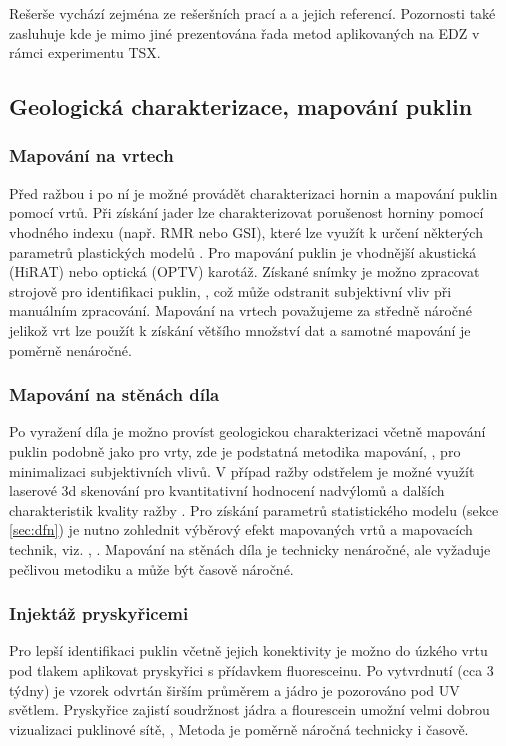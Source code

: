 \documentclass{article}
\begin{document}
Rešerše vychází zejména ze rešeršních prací \cite{Vavro2016} a \cite{Lanyon2011} a jejich referencí. 
Pozornosti také zasluhuje \cite{Chandler2002} kde je mimo jiné prezentována řada metod aplikovaných na EDZ v rámci experimentu TSX.



\subsection{Geologická charakterizace, mapování puklin}
\label{sec:mapovani_puklin}
\subsubsection{Mapování na vrtech}
Před ražbou i po ní je možné provádět charakterizaci hornin a mapování puklin pomocí vrtů. 
Při získání jader lze charakterizovat porušenost horniny pomocí vhodného indexu (např. RMR nebo GSI), 
které lze využít k určení některých parametrů plastických modelů \cite{Hoek2002}. 
Pro mapování puklin je vhodnější akustická (HiRAT) nebo optická (OPTV) karotáž. Získané snímky je možno 
zpracovat strojově pro identifikaci puklin, \cite{Tammisto2002}, což může odstranit subjektivní vliv při manuálním zpracování.
Mapování na vrtech považujeme za středně náročné jelikož vrt lze použít k získání většího množství dat 
a samotné mapování je poměrně nenáročné.

\subsubsection{Mapování na stěnách díla}
Po vyražení díla je možno províst geologickou charakterizaci včetně mapování puklin podobně jako pro vrty, 
zde je podstatná metodika mapování, \cite{Bossart2002},  pro minimalizaci subjektivních vlivů. 
V případ ražby odstřelem je možné využít laserové 3d skenování pro kvantitativní hodnocení 
nadvýlomů a dalších charakteristik kvality ražby \cite{Hudson2009a}. 
Pro získání parametrů statistického modelu (sekce \ref{sec:dfn}) je nutno zohlednit výběrový efekt 
mapovaných vrtů a mapovacích technik, viz. \cite{Zetterlund2012}, \cite{Torabi2011}. 
Mapování na stěnách díla je technicky nenáročné, ale vyžaduje pečlivou metodiku a může být časově náročné.

\subsubsection{Injektáž pryskyřicemi}
Pro lepší identifikaci puklin včetně jejich konektivity je možno do úzkého vrtu pod tlakem aplikovat 
pryskyřici s přídavkem fluoresceinu. Po vytvrdnutí (cca 3 týdny) je vzorek odvrtán širším průměrem a jádro je pozorováno pod UV světlem.
Pryskyřice zajistí soudržnost jádra a flourescein umožní velmi dobrou vizualizaci puklinové sítě, \cite{Bossart2002}, \cite{Lanyon2011}
Metoda je poměrně náročná technicky i časově.
\end{document}
